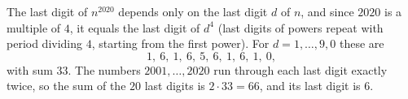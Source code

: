 The last digit of $n^{2020}$ depends only on the last digit $d$ of $n$, and since $2020$ is a multiple of $4$, it equals the last digit of $d^4$ (last digits of powers repeat with period dividing $4$, starting from the first power). For $d=1,\dots,9,0$ these are
\[
1,\ 6,\ 1,\ 6,\ 5,\ 6,\ 1,\ 6,\ 1,\ 0,
\]
with sum $33$. The numbers $2001,\dots,2020$ run through each last digit exactly twice, so the sum of the $20$ last digits is $2\cdot33=66$, and its last digit is $\boxed{6}$.
